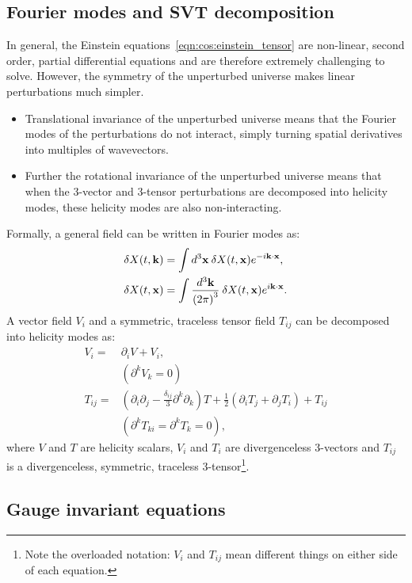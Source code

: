 \subsection{Fourier modes and SVT decomposition}
In general, the Einstein equations~\eqref{eqn:cos:einstein_tensor} are non-linear, second order, partial differential equations and are therefore extremely challenging to solve. However, the symmetry of the unperturbed universe makes linear perturbations much simpler. 
\begin{itemize}
  \item Translational invariance of the unperturbed universe means that the Fourier modes of the perturbations do not interact, simply turning spatial derivatives into multiples of wavevectors. 
  \item Further the rotational invariance of  the unperturbed universe means that when the 3-vector and 3-tensor perturbations are decomposed into helicity modes, these helicity modes are also non-interacting.
\end{itemize}
Formally, a general field can be written in Fourier modes as:
\begin{align}
  \delta X(t,\mathbf{k}) &= \int d^3\mathbf{x}\: \delta X(t,\mathbf{x}) e^{-i\mathbf{k} \cdot \mathbf{x}},\\
  \delta X(t,\mathbf{x}) &= \int \frac{d^3\mathbf{k}}{{(2\pi)}^3}\: \delta X(t,\mathbf{x}) e^{i\mathbf{k} \cdot \mathbf{x}}.
\end{align}
A vector field $V_i$ and a symmetric, traceless tensor field $T_{ij}$ can be decomposed into helicity modes as:
\begin{align}
  V_i =& \partial_i V + V_i,   \nonumber\\
  &(\partial^k V_k=0) \\
  T_{ij} =& (\partial_i\partial_j - \frac{\delta_{ij}}{3}\partial^k\partial_k)T + \frac{1}{2}(\partial_i T_j + \partial_j T_i) + T_{ij} \nonumber\\ 
  &(\partial^k T_{ki} = \partial^k T_k = 0),
\end{align}
where $V$ and $T$ are helicity scalars, $V_i$ and $T_i$ are divergenceless 3-vectors and $T_{ij}$ is a divergenceless, symmetric, traceless 3-tensor\footnote{Note the overloaded notation: $V_i$ and $T_{ij}$ mean different things on either side of each equation.}.

\subsection{Gauge invariant equations}



